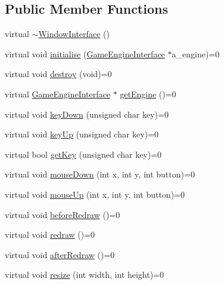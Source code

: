 \subsection*{Public Member Functions}
\begin{DoxyCompactItemize}
\item 
virtual \hyperlink{classWindowInterface_a38329b7b17b5ae765d81e40e8093f4c5}{$\sim$\-Window\-Interface} ()
\item 
virtual void \hyperlink{classWindowInterface_a8277c1eb7d3ae7b3f13e06081ffcf66a}{initialise} (\hyperlink{classGameEngineInterface}{Game\-Engine\-Interface} $\ast$a\-\_\-engine)=0
\item 
virtual void \hyperlink{classWindowInterface_afeaed24b8e350acb196964106f2a0146}{destroy} (void)=0
\item 
virtual \hyperlink{classGameEngineInterface}{Game\-Engine\-Interface} $\ast$ \hyperlink{classWindowInterface_ac5970434199b518109a95a5cb645814a}{get\-Engine} ()=0
\item 
virtual void \hyperlink{classWindowInterface_a874548802028401146c44f7ba3e54d1d}{key\-Down} (unsigned char key)=0
\item 
virtual void \hyperlink{classWindowInterface_aa776c5cf4ef3d93a49613e08c79cab77}{key\-Up} (unsigned char key)=0
\item 
virtual bool \hyperlink{classWindowInterface_ab67d23a3dee052fd5901a87518b86e4d}{get\-Key} (unsigned char key)=0
\item 
virtual void \hyperlink{classWindowInterface_a5e6ba2b8e6560e9e3b74794cfd123d59}{mouse\-Down} (int x, int y, int button)=0
\item 
virtual void \hyperlink{classWindowInterface_a482961a40e4a07d7f7ac81fe62ee7762}{mouse\-Up} (int x, int y, int button)=0
\item 
virtual void \hyperlink{classWindowInterface_a8aa6ce7a663628e3bd0480d4566191d2}{before\-Redraw} ()=0
\item 
virtual void \hyperlink{classWindowInterface_a9baf4b0e9c1fdd73b1fe14af4173c699}{redraw} ()=0
\item 
virtual void \hyperlink{classWindowInterface_a37e350fc8f4a97333400c03e8544b2eb}{after\-Redraw} ()=0
\item 
virtual void \hyperlink{classWindowInterface_aa7109fc50fd3e90b0589bdd2a5e6972e}{resize} (int width, int height)=0
\end{DoxyCompactItemize}


